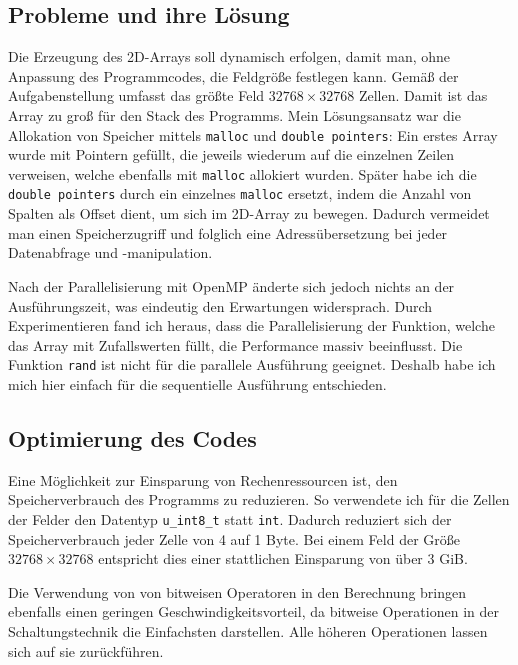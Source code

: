 \documentclass[german,plainarticle,hyperref,utf8]{zihpub}
\begin{document}
	\subsection{Probleme und ihre Lösung}
	Die Erzeugung des 2D-Arrays soll dynamisch erfolgen, damit man, ohne Anpassung des Programmcodes, die Feldgröße festlegen kann. Gemäß der Aufgabenstellung umfasst das größte Feld $32768\times 32768$ Zellen. Damit ist das Array zu groß für den Stack des Programms.
	Mein Lösungsansatz war die Allokation von Speicher mittels \verb|malloc| und \verb|double pointers|: Ein erstes Array wurde mit Pointern gefüllt, die jeweils wiederum auf die einzelnen Zeilen verweisen, welche ebenfalls mit \verb|malloc| allokiert wurden.
	Später habe ich die \verb|double pointers| durch ein einzelnes \verb|malloc| ersetzt, indem die Anzahl von Spalten als Offset dient, um sich im 2D-Array zu bewegen. Dadurch vermeidet man einen Speicherzugriff und folglich eine Adressübersetzung bei jeder Datenabfrage und -manipulation.
	
	Nach der Parallelisierung mit OpenMP änderte sich jedoch nichts an der Ausführungszeit, was eindeutig den Erwartungen widersprach. Durch Experimentieren fand ich heraus, dass die Parallelisierung der Funktion, welche das Array mit Zufallswerten füllt, die Performance massiv beeinflusst. Die Funktion \verb|rand| ist nicht für die parallele Ausführung geeignet. Deshalb habe ich mich hier einfach für die sequentielle Ausführung entschieden.
	
	\subsection{Optimierung des Codes}
	Eine Möglichkeit zur Einsparung von Rechenressourcen ist, den Speicherverbrauch des Programms zu reduzieren. So verwendete ich für die Zellen der Felder den Datentyp \verb|u_int8_t| statt \verb|int|. Dadurch reduziert sich der Speicherverbrauch jeder Zelle von 4 auf 1 Byte. Bei einem Feld der Größe $32768\times 32768$ entspricht dies einer stattlichen Einsparung von über 3 GiB.
	
	Die Verwendung von von bitweisen Operatoren in den Berechnung bringen ebenfalls einen geringen Geschwindigkeitsvorteil, da bitweise Operationen in der Schaltungstechnik die Einfachsten darstellen. Alle höheren Operationen lassen sich auf sie zurückführen.
\end{document}
